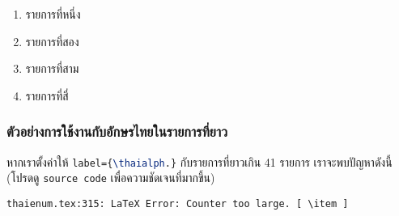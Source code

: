 \documentclass[11pt]{ltxguide}
\begin{document}
\begin{enumerate}[topsep=0pc,itemsep=0pc,label={\thaialph*.}]
    \item  รายการที่หนึ่ง
    \item  รายการที่สอง
    \item  รายการที่สาม
    \item  รายการที่สี่
\end{enumerate}

\newpage
\subsubsection{ตัวอย่างการใช้งานกับอักษรไทยในรายการที่ยาว}

หากเราตั้งค่าให้ \lstinline[language=LaTeX]!label={\thaialph.}! กับรายการที่ยาวเกิน 41 รายการ เราจะพบปัญหาดังนี้ (โปรดดู \texttt{source code} เพื่อความชัดเจนที่มากขึ้น)
\begin{center}
    \color{red}\texttt{thaienum.tex:315: LaTeX Error: Counter too large. [ {\textbackslash}item ]}
\end{center}
\end{document}
